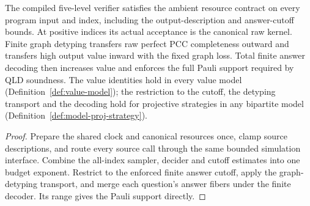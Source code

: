 \begin{lemma}
\label{lem:intro-ambient-kernel}
\leanok
The compiled five-level verifier satisfies the ambient resource contract
on every program input and index, including the output-description and
answer-cutoff bounds. At positive indices its actual acceptance is the
canonical raw kernel. Finite graph detyping transfers raw perfect PCC
completeness outward and transfers high output value inward with the fixed
graph loss. Total finite answer decoding then increases value and enforces
the full Pauli support required by QLD soundness.
The value identities hold in every value model (Definition~\ref{def:value-model}); the
restriction to the cutoff, the detyping transport and the decoding hold for projective
strategies in any bipartite model (Definition~\ref{def:model-proj-strategy}).
\end{lemma}
\begin{proof}
\leanok
Prepare the shared clock and canonical resources once, clamp source
descriptions, and route every source call through the same bounded
simulation interface. Combine the all-index sampler, decider and cutoff
estimates into one budget exponent. Restrict to the enforced finite answer
cutoff, apply the graph-detyping transport, and merge each question's answer
fibers under the finite decoder. Its range gives the Pauli support directly.
\end{proof}

